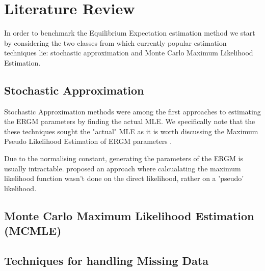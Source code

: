 \section{Literature Review}  

In order to benchmark the Equilibrium Expectation estimation method we start by considering the two classes from which currently popular estimation techniques lie: stochastic approximation and Monte Carlo Maximum Likelihood Estimation.

\subsection{Stochastic Approximation}

Stochastic Approximation methods were among the first approaches to estimating the ERGM parameters by finding the actual MLE. We specifically note that the these techniques sought the "actual" MLE as it is worth discussing the Maximum Pseudo Likelihood Estimation of ERGM parameters \citet{straussikeda1990}.


Due to the normalising constant, generating the parameters of the ERGM is usually intractable. \citeauthor{straussikeda1990} proposed an approach where calcualating the maximum likelihood function wasn't done on the direct likelihood, rather on a 'pseudo' likelihood.


\subsection{Monte Carlo Maximum Likelihood Estimation (MCMLE)}

\subsection{Techniques for handling Missing Data}